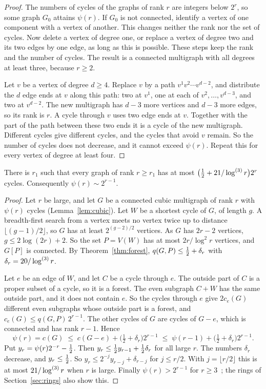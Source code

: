 \begin{proof}
The numbers of cycles of the graphs of rank $r$ are integers below $2^{r}$, so some graph $G_0$
attains $\psi(r)$. If $G_0$ is not connected, identify a vertex of one component with a vertex of
another. This changes neither the rank nor the set of cycles. Now delete a vertex of degree one, or
replace a vertex of degree two and its two edges by one edge, as long as this is possible. These
steps keep the rank and the number of cycles. The result is a connected multigraph with all
degrees at least three, because $r\ge2$.

Let $v$ be a vertex of degree $d\ge4$. Replace $v$ by a path $v^{1}v^{2}\cdots v^{d-2}$, and
distribute the $d$ edge ends at $v$ along this path: two at $v^{1}$, one at each of
$v^{2},\dots,v^{d-3}$, and two at $v^{d-2}$. The new multigraph has $d-3$ more vertices and $d-3$
more edges, so its rank is $r$. A cycle through $v$ uses two edge ends at $v$. Together with the
part of the path between these two ends it is a cycle of the new multigraph. Different cycles give
different cycles, and the cycles that avoid $v$ remain. So the number of cycles does not decrease,
and it cannot exceed $\psi(r)$. Repeat this for every vertex of degree at least four.
\end{proof}

\begin{corollary}\label{cor:cycles}
There is $r_1$ such that every graph of rank $r\ge r_1$ has at most
$\bigl(\tfrac12+21/\log^{(3)}r\bigr)2^{r}$ cycles. Consequently $\psi(r)\sim2^{r-1}$.
\end{corollary}

\begin{proof}
Let $r$ be large, and let $G$ be a connected cubic multigraph of rank $r$ with $\psi(r)$ cycles
(Lemma~\ref{lem:cubic}). Let $W$ be a shortest cycle of $G$, of length $g$. A breadth-first search
from a vertex meets no vertex twice up to distance $\lfloor(g-1)/2\rfloor$, so $G$ has at least
$2^{(g-2)/2}$ vertices. As $G$ has $2r-2$ vertices, $g\le2\log(2r)+2$.
So the set $P=V(W)$ has at most $2r/\log^{2}r$ vertices, and $G[P]$ is connected. By
Theorem~\ref{thm:forest}, $q(G,P)\le\tfrac12+\delta_r$ with $\delta_r=20/\log^{(3)}r$.

Let $e$ be an edge of $W$, and let $C$ be a cycle through $e$. The outside part of $C$ is a
proper subset of a cycle, so it is a forest. The even subgraph $C+W$ has the same outside part,
and it does not contain $e$. So the cycles through $e$ give $2c_e(G)$ different even subgraphs
whose outside part is a forest, and $c_e(G)\le q(G,P)\,2^{r-1}$. The other cycles of $G$ are
cycles of $G-e$, which is connected and has rank $r-1$. Hence
\[
  \psi(r)=c(G)\;\le\;c(G-e)+\bigl(\tfrac12+\delta_r\bigr)2^{r-1}
  \;\le\;\psi(r-1)+\bigl(\tfrac12+\delta_r\bigr)2^{r-1}.
\]
Put $y_r=\psi(r)2^{-r}-\tfrac12$. Then $y_r\le\tfrac12 y_{r-1}+\tfrac12\delta_r$ for all large $r$. The
numbers $\delta_r$ decrease, and $y_r\le\tfrac12$. So $y_r\le2^{-j}y_{r-j}+\delta_{r-j}$ for
$j\le r/2$. With $j=\lfloor r/2\rfloor$ this is at most $21/\log^{(3)}r$ when $r$ is large. Finally
$\psi(r)>2^{r-1}$ for $r\ge3$~\cite{ES}; the rings of Section~\ref{sec:rings} also show this.
\end{proof}
